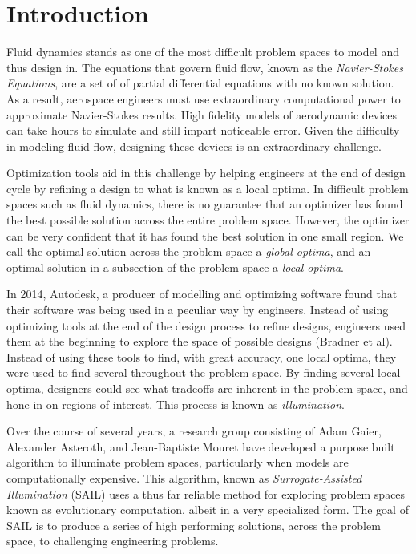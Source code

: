 \documentclass{sig-alternate}
\begin{document}

\section{Introduction}
\label{sec:introduction}


Fluid dynamics stands as one of the most difficult problem spaces to model and thus design in.
The equations that govern fluid flow, known as the \textit{Navier-Stokes Equations}, are a set of of partial differential equations with no known solution.
As a result, aerospace engineers must use extraordinary computational power to approximate Navier-Stokes results.
High fidelity models of aerodynamic devices can take hours to simulate and still impart noticeable error.
Given the difficulty in modeling fluid flow, designing these devices is an extraordinary challenge.

Optimization tools aid in this challenge by helping engineers at the end of design cycle by refining a design to what is known as a local optima.
In difficult problem spaces such as fluid dynamics, there is no guarantee that an optimizer has found the best possible solution across the entire problem space.
However, the optimizer can be very confident that it has found the best solution in one small region.
We call the optimal solution across the problem space a \textit{global optima}, and an optimal solution in a subsection of the problem space a \textit{local optima}. 

In 2014, Autodesk, a producer of modelling and optimizing software found that their software was being used in a peculiar way by engineers.
Instead of using optimizing tools at the end of the design process to refine designs, engineers used them at the beginning to explore the space of possible designs (Bradner et al).
Instead of using these tools to find, with great accuracy, one local optima, they were used to find several throughout the problem space.
By finding several local optima, designers could see what tradeoffs are inherent in the problem space, and hone in on regions of interest.
This process is known as \textit{illumination}.

Over the course of several years, a research group consisting of Adam Gaier, Alexander Asteroth, and Jean-Baptiste Mouret have developed a purpose built algorithm to illuminate problem spaces, particularly when models are computationally expensive.
This algorithm, known as \textit{Surrogate-Assisted Illumination} (SAIL) uses a thus far reliable method for exploring problem spaces known as evolutionary computation, albeit in a very specialized form.
The goal of SAIL is to produce a series of high performing solutions, across the problem space, to challenging engineering problems.
\end{document}
